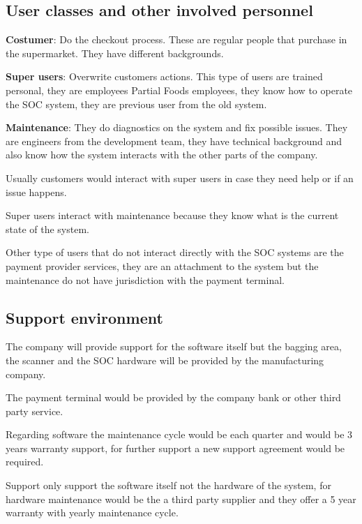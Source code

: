 \subsection{User classes and other involved personnel}

\textbf{Costumer}: Do the checkout process. These are regular people that 
purchase in the supermarket. They have different backgrounds. 
\newline

\noindent
\textbf{Super users}: Overwrite customers actions. This type of users are 
trained personal, they are employees Partial Foods employees, they know how to 
operate the SOC system, they are previous user from the old system. 
\newline

\noindent
\textbf{Maintenance}: They do diagnostics on the system and fix possible 
issues. They are engineers from the development team, they have technical 
background and also know how the system interacts with the other parts 
of the company. 
\newline

\noindent
Usually customers would interact with super users in case they need help or 
if an issue happens. 
\newline

\noindent
Super users interact with maintenance because they know what is the current 
state of the system. 
\newline

\noindent
Other type of users that do not interact directly with the SOC systems are the 
payment provider services, they are an attachment to the system but the 
maintenance do not have jurisdiction with the payment terminal. 
\newline

\subsection{Support environment}

The company will provide support for the software itself but the bagging 
area, the scanner and the SOC hardware will be provided by the 
manufacturing company. 
\newline

\noindent
The payment terminal would be provided by the company bank or other third 
party service. 
\newline

\noindent
Regarding software the maintenance cycle would be each quarter and would be 3 
years warranty support, for further support a new support agreement would be 
required. 
\newline

\noindent
Support only support the software itself not the hardware of the system, for 
hardware maintenance would be the a third party supplier and they offer a 
5 year warranty with yearly maintenance cycle. 
\newline
